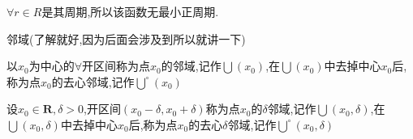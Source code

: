 \documentclass[UTF8]{ctexart}
\begin{document}
$\forall r \in R$是其周期,所以该函数无最小正周期.

邻域(了解就好,因为后面会涉及到所以就讲一下)

以$x_{0}$为中心的$\forall $开区间称为点$x_{0}$的邻域,记作$\bigcup (x_{0})$,在$\bigcup (x_{0})$中去掉中心$x_{0}$后,称为点$x_{0}$的去心邻域,记作$\bigcup \limits^{\circ }(x_{0})$

设$x_{0}\in \mathbf{R} ,\delta >0$,开区间$(x_{0}-\delta ,x_{0}+\delta ) $称为点$x_{0}$的$\delta $邻域,记作$\bigcup (x_{0},\delta )$,在$\bigcup (x_{0},\delta )$中去掉中心$x_{0}$后,称为点$x_{0}$的去心$\delta $邻域,记作$\bigcup \limits^{\circ }(x_{0},\delta )$
\end{document}
